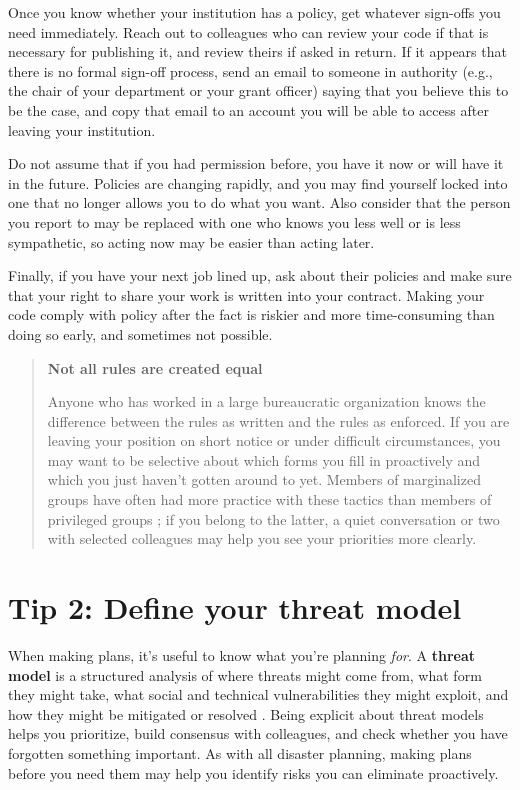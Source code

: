 \documentclass[10pt,letterpaper]{article}
\begin{document}
Once you know whether your institution has a policy,
get whatever sign-offs you need immediately.
Reach out to colleagues who can review your code if that is necessary for publishing it,
and review theirs if asked in return.
If it appears that there is no formal sign-off process,
send an email to someone in authority
(e.g., the chair of your department or your grant officer)
saying that you believe this to be the case,
and copy that email to an account you will be able to access
after leaving your institution.

Do not assume that if you had permission before,
you have it now or will have it in the future.
Policies are changing rapidly,
and you may find yourself locked into one that no longer allows you to do what you want.
Also consider that the person you report to may be replaced with one who knows you less well or is less sympathetic,
so acting now may be easier than acting later.

Finally,
if you have your next job lined up,
ask about their policies
and make sure that your right to share your work is written into your contract.
Making your code comply with policy after the fact is riskier and more time-consuming than doing so early,
and sometimes not possible.

\begin{quote}
  \noindent
  \textbf{Not all rules are created equal}

  Anyone who has worked in a large bureaucratic organization knows
  the difference between the rules as written and the rules as enforced.
  If you are leaving your position on short notice or under difficult circumstances,
  you may want to be selective about which forms you fill in proactively
  and which you just haven't gotten around to yet.
  Members of marginalized groups have often had more practice with these tactics
  than members of privileged groups \cite{Scott1987};
  if you belong to the latter,
  a quiet conversation or two with selected colleagues may help you see your priorities more clearly.
\end{quote}

\section*{Tip 2: Define your threat model}

When making plans, it's useful to know what you're planning \emph{for}.
A \textbf{threat model} is a structured analysis of where threats might come from,
what form they might take,
what social and technical vulnerabilities they might exploit,
and how they might be mitigated or resolved \cite{Torr2005}.
Being explicit about threat models helps you prioritize,
build consensus with colleagues,
and check whether you have forgotten something important.
As with all disaster planning,
making plans before you need them may help you identify risks you can eliminate proactively.
\end{document}
